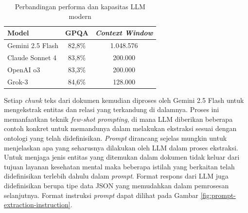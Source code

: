 \begin{table}[ht]
	\centering
	\caption{Perbandingan performa dan kapasitas LLM modern}
	\label{tab:llm-comparison}
	\begin{tabular}{|l|c|c|}
		\hline
		\textbf{Model}   & \textbf{GPQA} & \textbf{\textit{Context Window}} \\
		\hline \hline
		Gemini 2.5 Flash & 82,8\%        & 1.048.576                        \\
		\hline
		Claude Sonnet 4  & 83,8\%        & 200.000                          \\
		\hline
		OpenAI o3        & 83,3\%        & 200.000                          \\
		\hline
		Grok-3           & 84,6\%        & 128.000                          \\
		\hline
	\end{tabular}
\end{table}

\pagebreak
Setiap \textit{chunk} teks dari dokumen kemudian diproses oleh Gemini 2.5 Flash untuk mengekstrak entitas dan relasi yang terkandung di dalamnya.
Proses ini memanfaatkan teknik \textit{few-shot prompting}, di mana LLM diberikan beberapa contoh konkret untuk memandunya dalam melakukan ekstraksi sesuai dengan ontologi yang telah didefinisikan.
\textit{Prompt} dirancang sejelas mungkin untuk menjelaskan apa yang seharusnya dilakukan oleh LLM dalam proses ekstraksi.
Untuk menjaga jenis entitas yang ditemukan dalam dokumen tidak keluar dari tujuan layanan kesehatan mental maka beberapa istilah yang berkaitan telah didefinisikan terlebih dahulu dalam \textit{prompt}.
Format respons dari LLM juga didefinisikan berupa tipe data JSON yang memudahkan dalam pemrosesan selanjutnya. Format instruksi \textit{prompt} dapat dilihat pada Gambar \ref{fig:prompt-extraction-instruction}.

